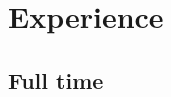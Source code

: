\documentclass[a4paper]{cv-friggeri-x}
\begin{document}




\section{Experience}

\subsection{Full time}
\end{document}
